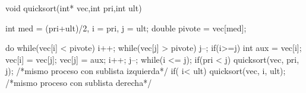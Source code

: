void quicksort(int* vec,int pri,int ult)
{
    int med = (pri+ult)/2, i = pri, j = ult;
    double pivote = vec[med];

    do{   
        while(vec[i] < pivote) { i++; }
        while(vec[j] > pivote) { j--; }
        if(i>=j){
            int aux = vec[i];
            vec[i] = vec[j];
            vec[j] = aux;
            i++;
            j--;
        }
    } while(i <= j);
    if(pri < j)
        quicksort(vec, pri, j); /*mismo proceso con sublista izquierda*/
    if( i< ult)
        quicksort(vec, i, ult); /*mismo proceso con sublista derecha*/
}